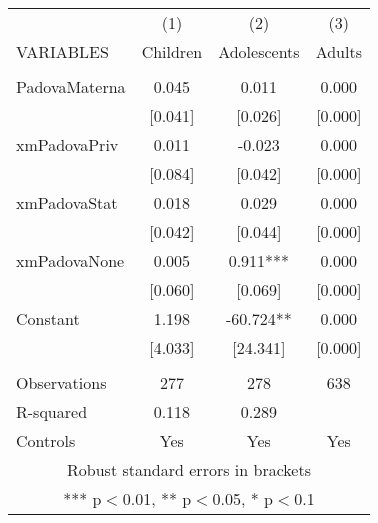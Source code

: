 \begin{tabular}{lccc} \hline
 & (1) & (2) & (3) \\
VARIABLES & Children & Adolescents & Adults \\ \hline
 &  &  &  \\
PadovaMaterna & 0.045 & 0.011 & 0.000 \\
 & [0.041] & [0.026] & [0.000] \\
xmPadovaPriv & 0.011 & -0.023 & 0.000 \\
 & [0.084] & [0.042] & [0.000] \\
xmPadovaStat & 0.018 & 0.029 & 0.000 \\
 & [0.042] & [0.044] & [0.000] \\
xmPadovaNone & 0.005 & 0.911*** & 0.000 \\
 & [0.060] & [0.069] & [0.000] \\
Constant & 1.198 & -60.724** & 0.000 \\
 & [4.033] & [24.341] & [0.000] \\
 &  &  &  \\
Observations & 277 & 278 & 638 \\
R-squared & 0.118 & 0.289 &  \\
 Controls & Yes & Yes & Yes \\ \hline
\multicolumn{4}{c}{ Robust standard errors in brackets} \\
\multicolumn{4}{c}{ *** p$<$0.01, ** p$<$0.05, * p$<$0.1} \\
\end{tabular}

